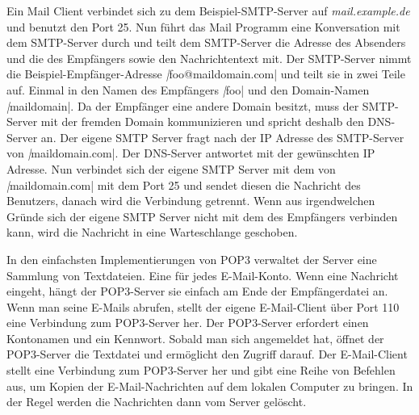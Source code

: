 Ein Mail Client verbindet sich zu dem Beispiel-SMTP-Server auf \textit{mail.example.de} und benutzt den Port 25.\newline
Nun führt das Mail Programm eine Konversation mit dem SMTP-Server durch und teilt dem SMTP-Server die Adresse des Absenders und die des Empfängers sowie den Nachrichtentext mit. \newline
Der SMTP-Server nimmt die Beispiel-Empfänger-Adresse \textit|foo@maildomain.com| und teilt sie in zwei Teile auf.\newline
Einmal in den Namen des Empfängers \textit|foo| und den Domain-Namen \textit|maildomain|.\newline
Da der Empfänger eine andere Domain besitzt, muss der SMTP-Server mit der fremden Domain kommunizieren und spricht deshalb den DNS-Server an.\newline
Der eigene SMTP Server fragt nach der IP Adresse des SMTP-Server von \textit|maildomain.com|. Der DNS-Server antwortet mit der gewünschten IP Adresse.
Nun verbindet sich der eigene SMTP Server mit dem von \textit|maildomain.com| mit dem Port 25 und sendet diesen die Nachricht des Benutzers, danach wird die Verbindung getrennt.\newline
Wenn aus irgendwelchen Gründe sich der eigene SMTP Server nicht mit dem des Empfängers verbinden kann, wird die Nachricht in eine Warteschlange geschoben.\newline\newline

In den einfachsten Implementierungen von POP3 verwaltet der Server eine Sammlung von Textdateien. Eine für jedes E-Mail-Konto. Wenn eine Nachricht eingeht, hängt der POP3-Server sie einfach am Ende der Empfängerdatei an.\newline
Wenn man seine E-Mails abrufen, stellt der eigene E-Mail-Client über Port 110 eine Verbindung zum POP3-Server her.\newline
Der POP3-Server erfordert einen Kontonamen und ein Kennwort. Sobald man sich angemeldet hat, öffnet der POP3-Server die Textdatei und ermöglicht den Zugriff darauf.
Der E-Mail-Client stellt eine Verbindung zum POP3-Server her und gibt eine Reihe von Befehlen aus, um Kopien der E-Mail-Nachrichten auf dem lokalen Computer zu bringen. 
In der Regel werden die Nachrichten dann vom Server gelöscht.\newline\newline

